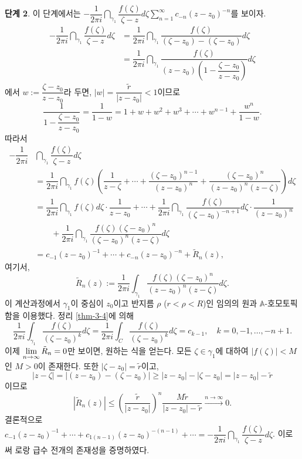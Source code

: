 {\bf 단계 2}. 이 단계에서는
$ - \dfrac1{2\pi i } \dint_{\gamma_1} \dfrac{f(\zeta)}{\zeta-z}d\zeta
\sum_{n=1}^\infty c_{-n}(z-z_0)^{-n}$를 보이자.
\begin{align*}
-\dfrac1{2\pi i } \dint_{\gamma_1} \dfrac{f(\zeta)}{\zeta-z}d\zeta
&= \dfrac1{2\pi i } \dint_{\gamma_1} \dfrac{f(\zeta)}{(\zeta-z_0) - (\zeta-z_0)}d\zeta \\
&= \dfrac1{2\pi i } \dint_{\gamma_1} \dfrac{f(\zeta)}{(z-z_0)
\left(1 - \dfrac{\zeta-z_0}{z-z_0}\right)}d\zeta
\end{align*}
에서 $w:= \dfrac{\zeta-z_0}{z-z_0}$라 두면,
$|w| = \dfrac{\tilde r}{|z-z_0|} <1$이므로
\[
\dfrac1{1 - \dfrac{\zeta-z_0}{z-z_0}}
= \dfrac1{1-w} = 1+ w + w^2 + w^3 + \cdots + w^{n-1} + \dfrac{w^n}{1-w}.
\]
따라서
\begin{align*}
-\dfrac1{2\pi i } & \dint_{\gamma_1} \dfrac{f(\zeta)}{\zeta-z}d\zeta \\
& = \dfrac1{2\pi i } \dint_{\gamma_1} f(\zeta) \left(
\dfrac1{z-\zeta} + \cdots + \dfrac{(\zeta-z_0)^{n-1}}{(z-z_0)^n}
+ \dfrac{(\zeta - z_0)^n}{(z-z_0)^n(z-\zeta)} \right) d\zeta \\
&=\dfrac1{2\pi i }  \dint_{\gamma_1} f(\zeta)d\zeta \cdot \dfrac1{z-z_0} 
+ \cdots + \dfrac1{2\pi i } \dint_{\gamma_1} \dfrac{f(\zeta)}{(\zeta-z_0)^{-n+1}} d\zeta
\cdot\dfrac1{(z-z_0)^n} \\
&\quad \quad + \dfrac1{2\pi i } \dint_{\gamma_1} 
\dfrac{f(\zeta)(\zeta-z_0)^n}{(\zeta-z_0)^n(z-\zeta)} d\zeta \\
& = c_{-1}(z-z_0)^{-1} + \cdots + c_{-n}(z-z_0)^{-n} + \tilde R_n(z),
\end{align*}
여기서, 
\[
\tilde R_n(z) := \dfrac1{2\pi i} \int_{\gamma_1} \dfrac{f(\zeta)(\zeta-z_0)^n}{(z-z_0)^n(z-\zeta)} d\zeta.
\]
이 계산과정에서 $\gamma_1$이 중심이 $z_0$이고 반지름 $\rho$ ($r<\rho<R$)인
임의의 원과 $\mathbb A$-호모토픽함을 이용했다.
정리 \ref{thm-3-4}에 의해
\[
\dfrac1{2\pi i} \int_{\gamma_1} \dfrac{f(\zeta)}{(\zeta-z_0)^k} d\zeta
= \dfrac1{2\pi i} \int_{C} \dfrac{f(\zeta)}{(\zeta-z_0)^k} d\zeta
= c_{k-1},
\quad k=0,-1,\ldots, -n+1.
\]
이제 
$\lim\limits_{n\to\infty} \tilde R_n = 0$만 보이면,
원하는 식을 얻는다.
모든 $\zeta \in \gamma_1$에 대하여 $|f(\zeta)| <M$인 $M>0$이 존재한다.
또한 $|\zeta - z_0| = \tilde r$이고,
\[
|z-\zeta| = |(z-z_0) -(\zeta - z_0) | \ge
|z- z_0| - |\zeta-z_0| =  |z-z_0| - \tilde r
\]
이므로 
\[
|\tilde R_n(z)| \le \left( \dfrac{\tilde r}{|z-z_0|} \right)^n
\dfrac{M \tilde r}{|z-z_0| - \tilde r} 
\stackrel{n\to\infty}{\longrightarrow} 0.
\]
결론적으로 
$c_{-1}(z-z_0)^{-1} +\cdots + c_{1(n-1)} (z-z_0)^{-(n-1)} + \cdots
= - \dfrac1{2\pi i } \dint_{\gamma_1} \dfrac{f(\zeta)}{\zeta-z}d\zeta$.
이로써 로랑 급수 전개의 존재성을 증명하였다.

